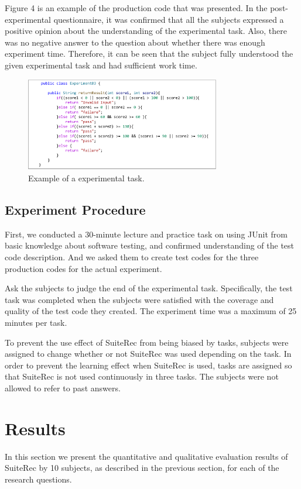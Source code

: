 \documentclass[conference]{IEEEtran}
\begin{document}
Figure 4 is an example of the production code that was presented. In the post-experimental questionnaire, it was confirmed that all the subjects expressed a positive opinion about the understanding of the experimental task. Also, there was no negative answer to the question about whether there was enough experiment time. Therefore, it can be seen that the subject fully understood the given experimental task and had sufficient work time.


\begin{figure}[htbp]
\centerline{\includegraphics[width=8.5cm]{task.pdf}}
\caption{Example of a experimental task.}
\label{fig}
\end{figure}

\subsection{Experiment Procedure}
First, we conducted a 30-minute lecture and practice task on using JUnit from basic knowledge about software testing, and confirmed understanding of the test code description. And we asked them to create test codes for the three production codes for the actual experiment.

Ask the subjects to judge the end of the experimental task. Specifically, the test task was completed when the subjects were satisfied with the coverage and quality of the test code they created. The experiment time was a maximum of 25 minutes per task.

To prevent the use effect of SuiteRec from being biased by tasks, subjects were assigned to change whether or not SuiteRec was used depending on the task. In order to prevent the learning effect when SuiteRec is used, tasks are assigned so that SuiteRec is not used continuously in three tasks. The subjects were not allowed to refer to past answers.

\section{Results}
In this section we present the quantitative and qualitative evaluation results of SuiteRec by 10 subjects, as described in the previous section, for each of the research questions.
\end{document}
